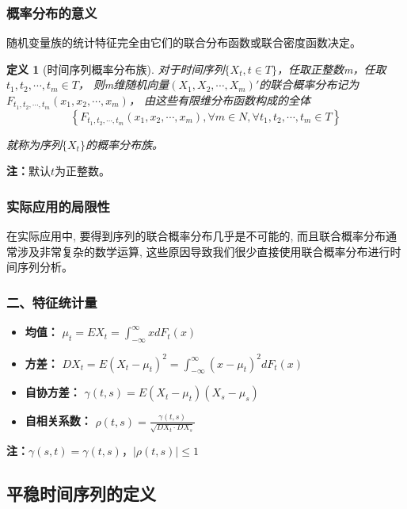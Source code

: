 \documentclass[12pt, a4paper, oneside]{ctexbook}
\newtheorem{definition}[theorem]{定义}
\begin{document}
\subsubsection{概率分布的意义}
随机变量族的统计特征完全由它们的联合分布函数或联合密度函数决定。
\begin{definition}[时间序列概率分布族]
    对于时间序列$\{X_t,t \in T\}$，任取正整数m，任取$t_1,t_2,\cdots,t_m\in T$，
    则m维随机向量$(X_1,X_2,\cdots,X_m)'$的联合概率分布记为$F_{t_1,t_2,\cdots,t_m}(x_1,x_2,\cdots,x_m)$，
    由这些有限维分布函数构成的全体
    \begin{equation}
        \left\{F_{t_1,t_2,\cdots,t_m}(x_1,x_2,\cdots,x_m),\forall m\in N,\forall t_1,t_2,\cdots,t_m\in T\right\}
    \end{equation}
    \par 就称为序列$\{X_t\}$的概率分布族。
\end{definition}
\textbf{注：}默认$t$为正整数。


\subsubsection{实际应用的局限性}
在实际应用中, 要得到序列的联合概率分布几乎是不可能的, 而且联合概率分布通常涉及非常复杂的数学运算, 这些原因导致我们很少直接使用联合概率分布进行时间序列分析。

\subsubsection{二、特征统计量}
\begin{itemize}
    \item \textbf{均值：} $\mu_t=EX_t=\int_{-\infty}^\infty xdF_t(x)$
    \item \textbf{方差：} $DX_t=E(X_t-\mu_t)^2=\int_{-\infty}^\infty(x-\mu_t)^2dF_t(x)$
    \item  \textbf{自协方差：} $\gamma(t,s)=E(X_t-\mu_t)(X_s-\mu_s)$
    \item  \textbf{自相关系数：} $\rho(t,s)=\frac{\gamma(t,s)}{\sqrt{DX_t\cdot DX_s}}$
\end{itemize}

\textbf{注：}$\gamma(s,t)=\gamma(t,s)\text{，}|\rho(t,s)| \leq 1 $

\subsection{平稳时间序列的定义}
\end{document}
